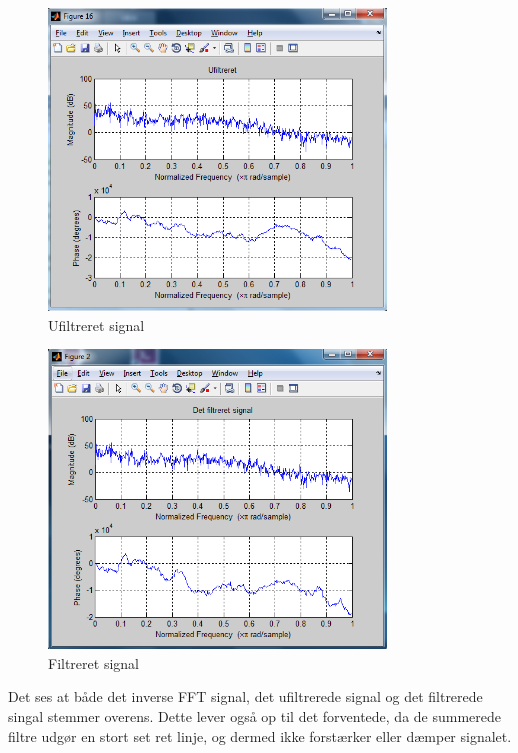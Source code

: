 \begin{figure}[h]
	\centering
	\includegraphics[width=0.8\textwidth]{Figurer/Ufiltreret_signal}
	\caption{Ufiltreret signal}
	\label{Figur 2}
\end{figure}

\begin{figure}[h]
	\centering
	\includegraphics[width=0.8\textwidth]{Figurer/2_Filtreret_signal}
	\caption{Filtreret signal}
	\label{figur 3}
\end{figure}


Det ses at både det inverse FFT signal, det ufiltrerede signal og det filtrerede singal stemmer overens. Dette lever også op til det forventede, da de summerede filtre udgør en stort set ret linje, og dermed ikke forstærker eller dæmper signalet.


